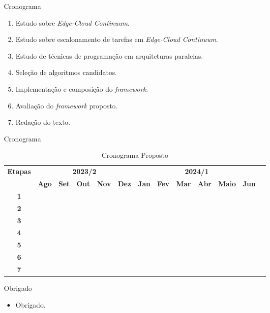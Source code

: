 \begin{frame}{Cronograma}
    \begin{enumerate}
        \item Estudo sobre \textit{Edge-Cloud Continuum}.
        \item Estudo sobre escalonamento de tarefas em \textit{Edge-Cloud Continuum}.
        \item Estudo de técnicas de programação em arquiteturas paralelas.
        \item Seleção de algoritmos candidatos.
        \item Implementação e composição do \textit{framework}.
        \item Avaliação do \textit{framework} proposto.
        \item Redação do texto.
    \end{enumerate}
\end{frame}

\begin{frame}{Cronograma}
    \begin{table}[htpd]
        \tiny
        \centering
        \noindent \begin{tabular}{|c|c|c|c|c|c|c|c|c|c|c|c|c|}
            \hline
            \multirow{2}{*}{\textbf{\small{Etapas}}} & \multicolumn{5}{|c|}{\textbf{\small{2023/2}}} &
            \multicolumn{6}{|c|}{\textbf{\small{2024/1}}} \\
            \cline{2-12}
            &\textbf{Ago} & \textbf{Set} & \textbf{Out} & \textbf{Nov} & \textbf{Dez} & \textbf{Jan} & 
            \textbf{Fev} & \textbf{Mar} & \textbf{Abr} & \textbf{Maio} & \textbf{Jun} \\
            \hline
            \textbf{\small{1}}  & \cellcolor{gray} & \cellcolor{gray} &  &   &   &   &   &   &   &   &   \\
            \hline
            \textbf{\small{2}}  &   & \cellcolor{gray} & \cellcolor{gray} &   &   &   &   &   &   &   &   \\
            \hline
            \textbf{\small{3}}  &   & \cellcolor{gray} & \cellcolor{gray} &   &   &   &   &   &   &   &   \\
            \hline
            \textbf{\small{4}}  &   &   & \cellcolor{gray} & \cellcolor{gray} & \cellcolor{gray} &  &  &  &  &  &   \\
            \hline
            \textbf{\small{5}}  &   &   &   &   & \cellcolor{gray} & \cellcolor{gray} & \cellcolor{gray} & \cellcolor{gray} &  &  &  \\
            \hline
            \textbf{\small{6}}  &   &   &   &   &   &   & \cellcolor{gray} & \cellcolor{gray} & \cellcolor{gray} &   &   \\
            \hline
            \textbf{\small{7}}  & \cellcolor{gray} & \cellcolor{gray} & \cellcolor{gray} & \cellcolor{gray} & \cellcolor{gray} & \cellcolor{gray} & \cellcolor{gray} & \cellcolor{gray} & \cellcolor{gray} & \cellcolor{gray} & \cellcolor{gray} \\
            \hline
        \end{tabular} 
        \label{tab:Cronograma}
        \caption{Cronograma Proposto}
    \end{table}
\end{frame}

\begin{frame}{Obrigado}
    \begin{itemize}
        \item Obrigado.
    \end{itemize}
\end{frame}
